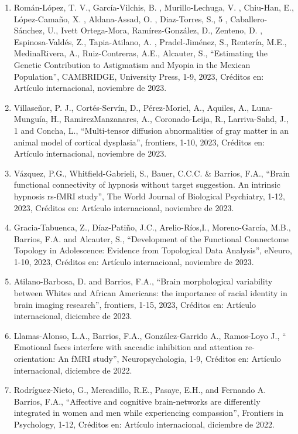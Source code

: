 \begin{enumerate}
\item Román-López, T. V., García-Vilchis, B. , Murillo-Lechuga, V. , Chiu-Han, E., López-Camaño, X. , Aldana-Assad, O. , 
Diaz-Torres, S., 5 , Caballero-Sánchez, U., Ivett Ortega-Mora, Ramírez-González, D., Zenteno, D. , Espinosa-Valdés, Z., 
Tapia-Atilano, A. , Pradel-Jiménez, S., Rentería, M.E., MedinaRivera, A., Ruiz-Contreras, A.E., Alcauter, S., “Estimating 
the Genetic Contribution to Astigmatism and Myopia in the Mexican Population”, CAMBRIDGE, University Press, 1-9, 2023, 
Créditos en: Artículo internacional, noviembre de 2023.

\item Villaseñor, P. J., Cortés-Servín, D., Pérez-Moriel, A., Aquiles, A., Luna-Munguía, H., RamirezManzanares, A., 
Coronado-Leija, R., Larriva-Sahd, J., 1 and Concha, L., “Multi-tensor diffusion abnormalities of gray matter in an animal 
model of cortical dysplasia”, frontiers, 1-10, 2023, Créditos en: Artículo internacional, noviembre de 2023.

\item Vázquez, P.G., Whitfield-Gabrieli, S., Bauer, C.C.C. \& Barrios, F.A., “Brain functional connectivity of hypnosis 
without target suggestion. An intrinsic hypnosis rs-fMRI study”, The World Journal of Biological Psychiatry, 1-12, 2023, 
Créditos en: Artículo internacional, noviembre de 2023.

\item Gracia-Tabuenca, Z., Díaz-Patiño, J.C., Arelio-Ríos,I., Moreno-García, M.B., Barrios, F.A. and Alcauter, S., 
“Development of the Functional Connectome Topology in Adolescence: Evidence from Topological Data Analysis”, eNeuro, 1-10, 
2023, Créditos en: Artículo internacional, noviembre de 2023.

\item Atilano-Barbosa, D. and Barrios, F.A., “Brain morphological variability between Whites and African Americans: the 
importance of racial identity in brain imaging research”, frontiers, 1-15, 2023, Créditos en: Artículo internacional, 
diciembre de 2023.

\item Llamas-Alonso, L.A., Barrios, F.A., González-Garrido A., Ramos-Loyo J., “ Emotional faces interfere with saccadic 
inhibition and attention re-orientation: An fMRI study”, Neuropsychologia, 1-9, Créditos en: Artículo internacional, 
diciembre de 2022.

\item Rodríguez-Nieto, G., Mercadillo, R.E., Pasaye, E.H., and Fernando A. Barrios, F.A., “Affective and cognitive 
brain-networks are differently integrated in women and men while experiencing compassion”, Frontiers in Psychology, 1-12, 
Créditos en: Artículo internacional, diciembre de 2022.


\end{enumerate}
